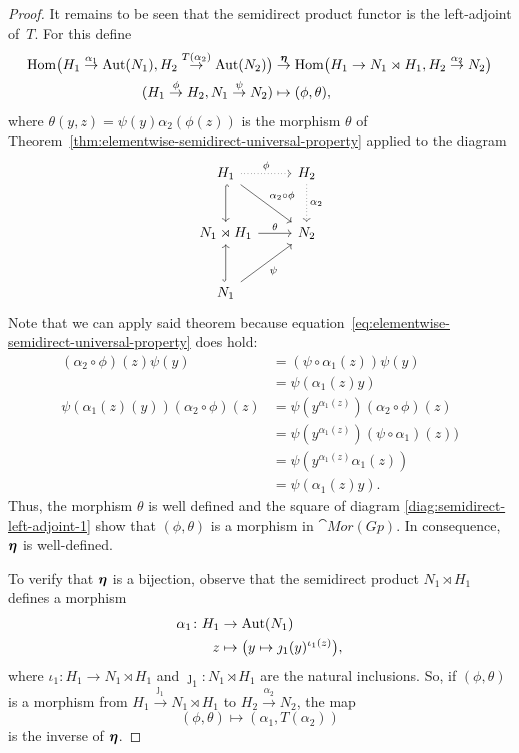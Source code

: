\begin{proof}
    It remains to be seen that the semidirect product functor is the left-adjoint of~$T$. For this define
    \begin{align*}
        {\rm Hom}\big(H_1\stackrel{\alpha_1}
            \to {\rm Aut}(N_1),H_2\stackrel{T(\alpha_2)}\to{\rm Aut}(N_2)\big)
        &\stackrel{\textrm{\boldmath$\eta$}}\to
            {\rm Hom}\big(H_1\to N_1\rtimes H_1,H_2\stackrel{\alpha_2}
            \to N_2\big)\\
        (H_1\stackrel\phi\to H_2,N_1\stackrel\psi\to N_2)
            &\mapsto(\phi,\theta),
    \end{align*}
    where $\theta(y,z)=\psi(y)\alpha_2(\phi(z))$ is the morphism $\theta$ of Theorem~\ref{thm:elementwise-semidirect-universal-property} applied to the diagram
    \begin{equation}\label{diag:semidirect-left-adjoint-1}
        \begin{tikzcd}[row sep=large]
            H_1
                    \arrow[d,hook]
                    \arrow[rd,"\alpha_2\circ\phi"]
                    \arrow[r,"\phi",dotted]
                &H_2
                    \arrow[d,"\alpha_2",dotted]\\
            N_1\rtimes H_1
                    \arrow[r,"\theta"]
                &N_2\\
            N_1
                \arrow[u,hook]
                \arrow[ru,"\psi"']&
        \end{tikzcd}
    \end{equation}
    Note that we can apply said theorem because equation~\eqref{eq:elementwise-semidirect-universal-property} does hold:
    \begin{align*}
        (\alpha_2\circ\phi)(z)\psi(y) &=(\psi\circ\alpha_1(z))\psi(y)\\
            &= \psi(\alpha_1(z)y)\\
        \psi(\alpha_1(z)(y))(\alpha_2\circ\phi)(z)
            &= \psi(y^{\alpha_1(z)})(\alpha_2\circ\phi)(z)\\
            &= \psi(y^{\alpha_1(z)})(\psi\circ\alpha_1)(z))\\
            &= \psi(y^{\alpha_1(z)}\alpha_1(z))\\
            &= \psi(\alpha_1(z)y).
    \end{align*}
    Thus, the morphism $\theta$ is well defined and the square of diagram \eqref{diag:semidirect-left-adjoint-1} show that $(\phi,\theta)$ is a morphism in $\cat{Mor(Gp)}$. In consequence, $\textrm{\boldmath$\eta$}$ is well-defined.

    To verify that $\textrm{\boldmath$\eta$}$ is a bijection, observe that the semidirect product $N_1\rtimes H_1$ defines a morphism
    \begin{align*}
        \alpha_1\colon H_1&\to{\rm Aut}(N_1)\\
        z&\mapsto\big(y\mapsto \jmath_1(y)^{\iota_1(z)}\big),
    \end{align*}
    where $\iota_1\colon H_1\to N_1\rtimes H_1$ and $\jmath_1\colon N_1\rtimes H_1$ are the natural inclusions. So, if $(\phi,\theta)$ is a morphism from $H_1\stackrel{\jmath_1}\to N_1\rtimes H_1$ to $H_2\stackrel{\alpha_2}\to N_2$, the map
    $$
        (\phi,\theta)\mapsto(\alpha_1,T(\alpha_2))
    $$
    is the inverse of $\textrm{\boldmath$\eta$}$.


\end{proof}
